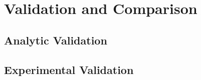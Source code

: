 
\chapter{Validation and Comparison}
\label{chp:NumMethodComp}

\section{Analytic Validation}


\section{Experimental Validation}


